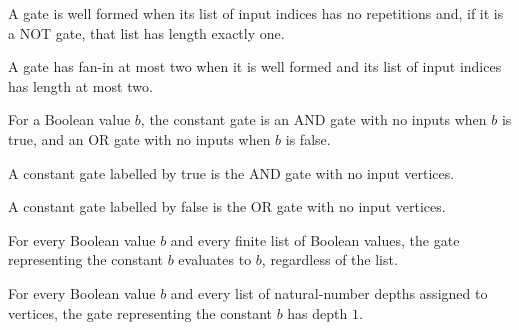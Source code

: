 \begin{definition}
\label{BoolCircuit.DAGGate.WellFormed}
\leanok
{}
A gate is well formed when its list of input indices has no repetitions and, if it is a
NOT gate, that list has length exactly one.
\end{definition}

\begin{definition}
\label{BoolCircuit.DAGGate.FaninTwo}
\leanok
{}
A gate has fan-in at most two when it is well formed and its list of input indices has
length at most two.
\end{definition}

\begin{definition}
\label{BoolCircuit.constGate}
\leanok
{}
For a Boolean value $b$, the constant gate is an AND gate with no inputs when $b$ is
true, and an OR gate with no inputs when $b$ is false.
\end{definition}

\begin{theorem}
\label{BoolCircuit.constGate_true}
\leanok
{}
A constant gate labelled by true is the AND gate with no input vertices.
\end{theorem}

\begin{theorem}
\label{BoolCircuit.constGate_false}
\leanok
{}
A constant gate labelled by false is the OR gate with no input vertices.
\end{theorem}

\begin{theorem}
\label{BoolCircuit.constGate_eval}
\leanok
{}
For every Boolean value $b$ and every finite list of Boolean values, the gate
representing the constant $b$ evaluates to $b$, regardless of the list.
\end{theorem}

\begin{theorem}
\label{BoolCircuit.constGate_depth}
\leanok
{}
For every Boolean value $b$ and every list of natural-number depths assigned to
vertices, the gate representing the constant $b$ has depth $1$.
\end{theorem}

